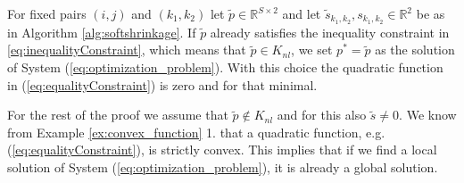 \documentclass[abstracton]{scrreprt}
\newenvironment{proof}[1][Proof]{\begin{trivlist}
\item[\hskip \labelsep {\bfseries #1}]}{\end{trivlist}}
\begin{document}
            \begin{proof}
            For fixed pairs $(i,j)$ and $(k_{1}, k_{2})$ let $\tilde{p} \in \mathbb{R}^{S \times 2}$ and let $\tilde{s}_{k_{1}, k_{2}}, s_{k_{1}, k_{2}} \in \mathbb{R}^{2}$ be as in Algorithm \ref{alg:softshrinkage}. If $\tilde{p}$ already satisfies the inequality constraint in \ref{eq:inequalityConstraint}, which means that $\tilde{p} \in K_{nl}$, we set $p^{\ast} = \tilde{p}$ as the solution of System (\ref{eq:optimization_problem}). With this choice the quadratic function in (\ref{eq:equalityConstraint}) is zero and for that minimal.

            For the rest of the proof we assume that $\tilde{p} \notin K_{nl}$ and for this also $\tilde{s} \neq 0$. We know from Example \ref{ex:convex_function} 1. that a quadratic function, e.g. (\ref{eq:equalityConstraint}), is strictly convex. This implies that if we find a local solution of System (\ref{eq:optimization_problem}), it is already a global solution.


\end{proof}
\end{document}

